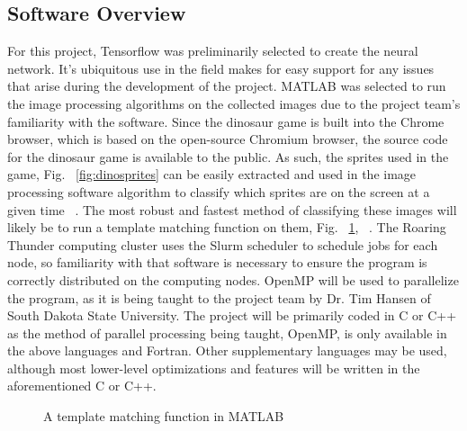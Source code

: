 \subsection{Software Overview}\label{subsec:bus_overview}
For this project, Tensorflow was preliminarily selected to create the neural network. It's ubiquitous use in the field makes for easy support for any issues that arise during the development of the project. MATLAB was selected to run the image processing algorithms on the collected images due to the project team's familiarity with the software. Since the dinosaur game is built into the Chrome browser, which is based on the open-source Chromium browser, the source code for the dinosaur game is available to the public. As such, the sprites used in the game, Fig. ~\ref{fig:dinosprites} can be easily extracted and used in the image processing software algorithm to classify which sprites are on the screen at a given time ~\cite{dino_github_src}. The most robust and fastest method of classifying these images will likely be to run a template matching function on them, Fig. ~\ref{fig:templatematch}, ~\cite{matlab_template_match}. The Roaring Thunder computing cluster uses the Slurm scheduler to schedule jobs for each node, so familiarity with that software is necessary to ensure the program is correctly distributed on the computing nodes. OpenMP will be used to parallelize the program, as it is being taught to the project team by Dr. Tim Hansen of South Dakota State University. The project will be primarily coded in C or C++ as the method of parallel processing being taught, OpenMP, is only available in the above languages and Fortran. Other supplementary languages may be used, although most lower-level optimizations and features will be written in the aforementioned C or C++.

\begin{figure}\label{fig:templatematch}
	\caption{A template matching function in MATLAB}
\end{figure}

